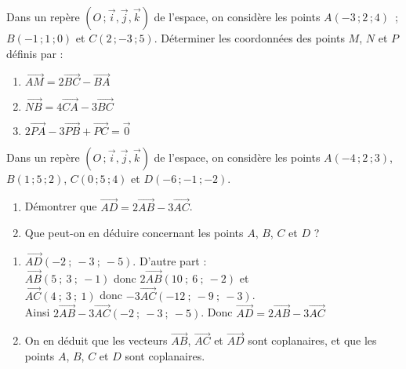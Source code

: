 \begin{colonne*exercice}
\begin{exercice}
  Dans un repère $(O\,;\vec{i},\vec{j},\vec{k})$ de l'espace, on
  considère les points $A(-3\,;2\,;4)$ \,; $B(-1\,;1\,;0)$ et
  $C(2\,;-3\,;5)$.  Déterminer les coordonnées des points $M$, $N$ et
  $P$ définis par :
  \begin{enumerate}
  \item $\overrightarrow{AM}=2\overrightarrow{BC}-\overrightarrow{BA}$
  \item
    $\overrightarrow{NB}=4\overrightarrow{CA}-3\overrightarrow{BC}$
  \item
    $2\overrightarrow{PA}-3\overrightarrow{PB}+\overrightarrow{PC}=\overrightarrow{0}$
  \end{enumerate}
\end{exercice}

\columnbreak

\begin{exercice*}\label{ex41G2}
  Dans un repère $(O\,;\vec{i},\vec{j},\vec{k})$ de l'espace, on
  considère les points $A(-4\,;2\,;3)$, $B(1\,;5\,;2)$, $C(0\,;5\,;4)$ et
  $D(-6\,;-1\,;-2)$.
  \begin{enumerate}
  \item Démontrer que
    $\overrightarrow{AD}=2\overrightarrow{AB}-3\overrightarrow{AC}$.
  \item Que peut-on en déduire concernant les points $A$, $B$, $C$ et
    $D$ ?
  \end{enumerate}
\end{exercice*}
\begin{corrige}
  \begin{enumerate}
\item $\overrightarrow{AD}(-2\ ;\ -3\ ;\ -5)$. D'autre part : \\ $\overrightarrow{AB}(5\ ;\ 3\ ;\ -1)$ donc $2\overrightarrow{AB}(10\ ;\ 6\ ;\ -2)$ et \\
$\overrightarrow{AC}(4\ ;\ 3\ ;\ 1)$ donc $-3\overrightarrow{AC}(-12\ ;\ -9\ ;\ -3)$.\\
Ainsi $2\overrightarrow{AB}-3\overrightarrow{AC}(-2\ ;\ -3\ ;\ -5)$.
Donc $\overrightarrow{AD}=2\overrightarrow{AB}-3\overrightarrow{AC}$
\item On en déduit que les vecteurs $\overrightarrow{AB}$, $\overrightarrow{AC}$ et $\overrightarrow{AD}$ sont coplanaires, et que les points $A$, $B$, $C$ et $D$ sont coplanaires.
 \end{enumerate}
\end{corrige}


\end{colonne*exercice}

